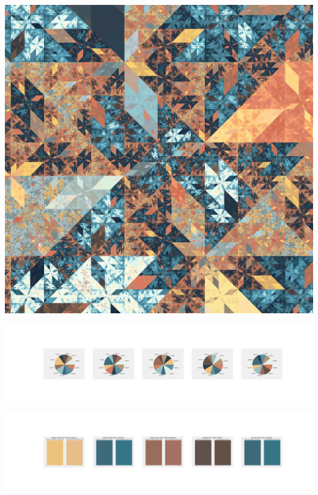 \documentclass[11pt]{article}
\begin{document}
\begin{landscape}
    \begin{center}
    \includegraphics[width=\textwidth]{./nbimg/file (357).jpg}
    \end{center}

    \begin{center}
    \includegraphics[width=250mm]{./nbimg/pie-286.jpg}
    \end{center}

    \begin{center}
    \includegraphics[width=250mm]{./nbimg/peak-286.jpg}
    \end{center}
    


\end{landscape}
\end{document}
